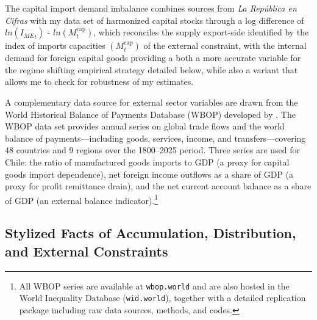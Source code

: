 The capital import demand imbalance combines sources from \textit{La República en Cifras} with my data set of harmonized capital stocks through a log difference of $ln({I_{ME}}_t)$ - $ln(M^{\text{cap}}_t)$, which reconciles the supply export-side identified by the index of imports capacities $(M^{\text{cap}}_t)$ of the external constraint, with the internal demand for foreign capital goods providing a both a more accurate variable for the regime shifting empirical strategy detailed below, while also a variant that allows me to check for robustness of my estimates. 

A complementary data source for external sector variables are drawn from the World Historical Balance of Payments Database (WBOP) developed by
\citet{NievasPiketty2025}. The WBOP data set provides annual series on global trade flows and the world balance of payments---including goods,
services, income, and transfers---covering 48 countries and 9 regions over
the 1800--2025 period. Three series are used for Chile: the ratio
of manufactured goods imports to GDP (a proxy for capital goods
import dependence), net foreign income outflows as a share of GDP (a
proxy for profit remittance drain), and the net current account
balance as a share of GDP (an external balance indicator).\footnote{All WBOP
	series are available at \texttt{wbop.world} and are also hosted in
	the World Inequality Database (\texttt{wid.world}), together with a
	detailed replication package including raw data sources, methods,
	and codes.}



\subsection{Stylized Facts of Accumulation, Distribution, and External Constraints}
\label{sec:4:stylized_facts}

